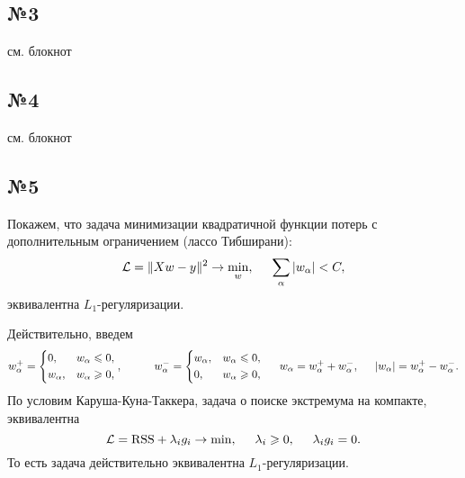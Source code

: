 \subsection*{№3}

см. блокнот


\subsection*{№4}

см. блокнот




\subsection*{№5}

Покажем, что задача минимизации квадратичной функции потерь с дополнительным ограничением (лассо Тибширани):
\begin{equation*}
    \mathcal L = \|X w - y\|^2 \to \min_w, 
    \hspace{5 mm} 
    \sum_\alpha
    |w_\alpha| < C,
\end{equation*}
эквивалентна $L_1$-регуляризации. 

Действительно, введем 
\begin{equation*}
    w_\alpha^+ = \left\{\begin{aligned}
        &0, &w_\alpha \leq 0, \\
        &w_\alpha, &w_\alpha \geq 0, \\
    \end{aligned}\right.
    ,
    \hspace{10 mm} 
    w_\alpha^- = \left\{\begin{aligned}
        &w_\alpha, &w_\alpha \leq 0, \\
        &0, &w_\alpha \geq 0, \\
    \end{aligned}\right.
    \hspace{5 mm} 
    w_\alpha = w_\alpha^+ + w_\alpha^-,
    \hspace{5 mm} 
    |w_\alpha| = w_\alpha^+ - w_\alpha^-.
\end{equation*}
По условим Каруша-Куна-Таккера, задача о поиске экстремума на компакте, эквивалентна
\begin{equation*}
    \mathcal L = \text{RSS} + \lambda_i g_i \to \min,
    \hspace{5 mm} 
    \lambda_i \geq 0, 
    \hspace{5 mm} 
    \lambda_i g_i = 0.
\end{equation*}
То есть задача действительно эквивалентна $L_1$-регуляризации. 




